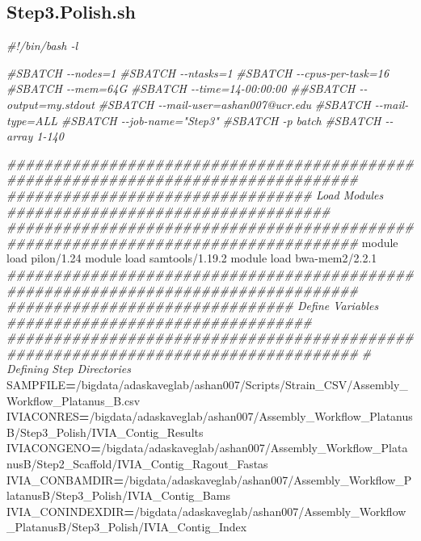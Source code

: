 \documentclass[
]{book}
\newenvironment{Shaded}{\begin{snugshade}}{\end{snugshade}}
\newcommand{\CommentTok}[1]{\textcolor[rgb]{0.56,0.35,0.01}{\textit{#1}}}
\newcommand{\ExtensionTok}[1]{#1}
\newcommand{\NormalTok}[1]{#1}
\newcommand{\OperatorTok}[1]{\textcolor[rgb]{0.81,0.36,0.00}{\textbf{#1}}}
\newcommand{\VariableTok}[1]{\textcolor[rgb]{0.00,0.00,0.00}{#1}}
\begin{document}
\subsection{Step3.Polish.sh}\label{Polish-script}

\begin{Shaded}
\begin{Highlighting}[]
\CommentTok{\#!/bin/bash {-}l}

\CommentTok{\#SBATCH {-}{-}nodes=1}
\CommentTok{\#SBATCH {-}{-}ntasks=1}
\CommentTok{\#SBATCH {-}{-}cpus{-}per{-}task=16}
\CommentTok{\#SBATCH {-}{-}mem=64G}
\CommentTok{\#SBATCH {-}{-}time=14{-}00:00:00}
\CommentTok{\#\#SBATCH {-}{-}output=my.stdout}
\CommentTok{\#SBATCH {-}{-}mail{-}user=ashan007@ucr.edu}
\CommentTok{\#SBATCH {-}{-}mail{-}type=ALL}
\CommentTok{\#SBATCH {-}{-}job{-}name="Step3"}
\CommentTok{\#SBATCH {-}p batch}
\CommentTok{\#SBATCH {-}{-}array 1{-}140}

\CommentTok{\#\#\#\#\#\#\#\#\#\#\#\#\#\#\#\#\#\#\#\#\#\#\#\#\#\#\#\#\#\#\#\#\#\#\#\#\#\#\#\#\#\#\#\#\#\#\#\#\#\#\#\#\#\#\#\#\#\#\#\#\#\#\#\#\#\#\#\#\#\#\#\#\#\#\#\#\#\#\#\#\#\#}
\CommentTok{\#\#\#\#\#\#\#\#\#\#\#\#\#\#\#\#\#\#\#\#\#\#\#\#\#\#\#\#\#\#\#\#\# Load Modules \#\#\#\#\#\#\#\#\#\#\#\#\#\#\#\#\#\#\#\#\#\#\#\#\#\#\#\#\#\#\#\#\#\#\#}
\CommentTok{\#\#\#\#\#\#\#\#\#\#\#\#\#\#\#\#\#\#\#\#\#\#\#\#\#\#\#\#\#\#\#\#\#\#\#\#\#\#\#\#\#\#\#\#\#\#\#\#\#\#\#\#\#\#\#\#\#\#\#\#\#\#\#\#\#\#\#\#\#\#\#\#\#\#\#\#\#\#\#\#\#\#}
\ExtensionTok{module}\NormalTok{ load pilon/1.24}
\ExtensionTok{module}\NormalTok{ load samtools/1.19.2}
\ExtensionTok{module}\NormalTok{ load bwa{-}mem2/2.2.1}
\CommentTok{\#\#\#\#\#\#\#\#\#\#\#\#\#\#\#\#\#\#\#\#\#\#\#\#\#\#\#\#\#\#\#\#\#\#\#\#\#\#\#\#\#\#\#\#\#\#\#\#\#\#\#\#\#\#\#\#\#\#\#\#\#\#\#\#\#\#\#\#\#\#\#\#\#\#\#\#\#\#\#\#\#\#}
\CommentTok{\#\#\#\#\#\#\#\#\#\#\#\#\#\#\#\#\#\#\#\#\#\#\#\#\#\#\#\#\#\#\# Define Variables \#\#\#\#\#\#\#\#\#\#\#\#\#\#\#\#\#\#\#\#\#\#\#\#\#\#\#\#\#\#\#\#\#}
\CommentTok{\#\#\#\#\#\#\#\#\#\#\#\#\#\#\#\#\#\#\#\#\#\#\#\#\#\#\#\#\#\#\#\#\#\#\#\#\#\#\#\#\#\#\#\#\#\#\#\#\#\#\#\#\#\#\#\#\#\#\#\#\#\#\#\#\#\#\#\#\#\#\#\#\#\#\#\#\#\#\#\#\#\#}
\CommentTok{\# Defining Step Directories}
\VariableTok{SAMPFILE}\OperatorTok{=}\NormalTok{/bigdata/adaskaveglab/ashan007/Scripts/Strain\_CSV/Assembly\_Workflow\_Platanus\_B.csv}
\VariableTok{IVIACONRES}\OperatorTok{=}\NormalTok{/bigdata/adaskaveglab/ashan007/Assembly\_Workflow\_PlatanusB/Step3\_Polish/IVIA\_Contig\_Results}
\VariableTok{IVIACONGENO}\OperatorTok{=}\NormalTok{/bigdata/adaskaveglab/ashan007/Assembly\_Workflow\_PlatanusB/Step2\_Scaffold/IVIA\_Contig\_Ragout\_Fastas}
\VariableTok{IVIA\_CONBAMDIR}\OperatorTok{=}\NormalTok{/bigdata/adaskaveglab/ashan007/Assembly\_Workflow\_PlatanusB/Step3\_Polish/IVIA\_Contig\_Bams}
\VariableTok{IVIA\_CONINDEXDIR}\OperatorTok{=}\NormalTok{/bigdata/adaskaveglab/ashan007/Assembly\_Workflow\_PlatanusB/Step3\_Polish/IVIA\_Contig\_Index}


\end{Highlighting}
\end{Shaded}
\end{document}
